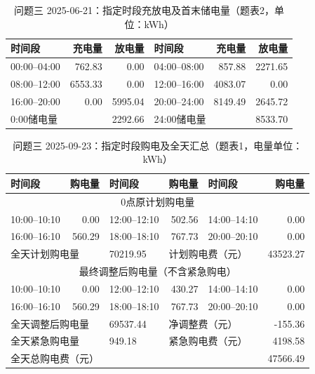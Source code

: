 \begin{table}[H]
\centering\footnotesize
\setlength{\tabcolsep}{4pt}
\caption{问题三 2025-06-21：指定时段充放电及首末储电量（题表2，单位：kWh）}
\label{tab:required-q3-2025-06-21-storage}
\begin{tabular}{@{}lrrlrr@{}}
\toprule
时间段 & 充电量 & 放电量 & 时间段 & 充电量 & 放电量 \\
\midrule
00:00--04:00 & 762.83 & 0.00 & 04:00--08:00 & 857.88 & 2271.65 \\
08:00--12:00 & 6553.33 & 0.00 & 12:00--16:00 & 4083.07 & 0.00 \\
16:00--20:00 & 0.00 & 5995.04 & 20:00--24:00 & 8149.49 & 2645.72 \\
\multicolumn{2}{l}{0:00储电量} & 2292.66 & \multicolumn{2}{l}{24:00储电量} & 8533.70 \\
\bottomrule
\end{tabular}
\end{table}

\FloatBarrier
\begin{table}[H]
\centering\footnotesize
\setlength{\tabcolsep}{4pt}
\caption{问题三 2025-09-23：指定时段购电及全天汇总（题表1，电量单位：kWh）}
\label{tab:required-q3-2025-09-23-grid}
\begin{tabular}{@{}lrlrlr@{}}
\toprule
时间段 & 购电量 & 时间段 & 购电量 & 时间段 & 购电量 \\
\midrule
\multicolumn{6}{c}{0点原计划购电量} \\
10:00--10:10 & 0.00 & 12:00--12:10 & 502.56 & 14:00--14:10 & 0.00 \\
16:00--16:10 & 560.29 & 18:00--18:10 & 767.73 & 20:00--20:10 & 0.00 \\
\multicolumn{2}{l}{全天计划购电量} & 70219.95 & \multicolumn{2}{l}{计划购电费（元）} & 43523.27 \\
\multicolumn{6}{c}{最终调整后购电量（不含紧急购电）} \\
10:00--10:10 & 0.00 & 12:00--12:10 & 430.27 & 14:00--14:10 & 0.00 \\
16:00--16:10 & 560.29 & 18:00--18:10 & 767.73 & 20:00--20:10 & 0.00 \\
\multicolumn{2}{l}{全天调整后购电量} & 69537.44 & \multicolumn{2}{l}{净调整费（元）} & -155.36 \\
\multicolumn{2}{l}{全天紧急购电量} & 949.18 & \multicolumn{2}{l}{紧急购电费（元）} & 4198.58 \\
\multicolumn{5}{l}{全天总购电费（元）} & 47566.49 \\
\bottomrule
\end{tabular}
\end{table}

